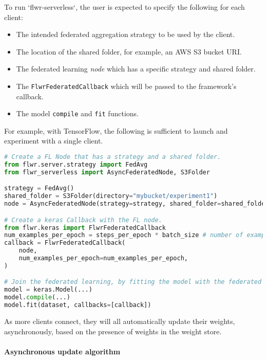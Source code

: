 \documentclass[twocolumn, switch]{article} %
\begin{document}
To run `flwr-serverless`, the user is expected to specify the following for each client:

\begin{itemize}
    \item The intended federated aggregation strategy to be used by the client.
    \item The location of the shared folder, for example, an AWS S3 bucket URI.
    \item The federated learning \textit{node} which has a specific strategy and shared folder.
    \item The \texttt{FlwrFederatedCallback} which will be passed to the framework's callback.
    \item The model \texttt{compile} and \texttt{fit} functions.
\end{itemize}

For example, with TensorFlow, the following is sufficient to launch and experiment with a single client. 

\begin{lstlisting}[language=Python]
# Create a FL Node that has a strategy and a shared folder.
from flwr.server.strategy import FedAvg
from flwr_serverless import AsyncFederatedNode, S3Folder

strategy = FedAvg()
shared_folder = S3Folder(directory="mybucket/experiment1")
node = AsyncFederatedNode(strategy=strategy, shared_folder=shared_folder)

# Create a keras Callback with the FL node.
from flwr.keras import FlwrFederatedCallback
num_examples_per_epoch = steps_per_epoch * batch_size # number of examples used in each epoch
callback = FlwrFederatedCallback(
    node,
    num_examples_per_epoch=num_examples_per_epoch,
)

# Join the federated learning, by fitting the model with the federated callback.
model = keras.Model(...)
model.compile(...)
model.fit(dataset, callbacks=[callback])
\end{lstlisting}

As more clients connect, they will all automatically update their weights, asynchronously, based on the presence of weights in the weight store.

\paragraph{Asynchronous update algorithm}
\end{document}
